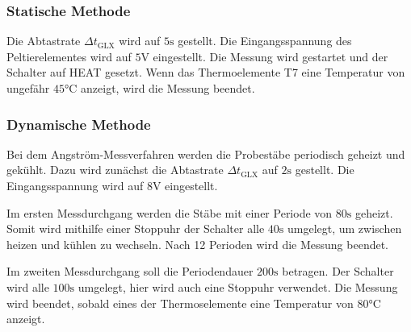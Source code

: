 \subsubsection{Statische Methode}
\label{subsubsec:statisch}
Die Abtastrate $\Delta t_\text{GLX}$ wird auf $5\si{\second}$ gestellt.
Die Eingangsspannung des Peltierelementes wird auf $5\si{\volt}$ eingestellt.
Die Messung wird gestartet und der Schalter auf HEAT gesetzt.
Wenn das Thermoelemente T7 eine Temperatur von ungefähr $45\si{\celsius}$ anzeigt,
wird die Messung beendet.
\subsubsection{Dynamische Methode}
\label{subsubsec:dynamisch}
Bei dem Angström-Messverfahren werden die Probestäbe periodisch geheizt und gekühlt.
Dazu wird zunächst die Abtastrate $\Delta t_\text{GLX}$ auf $2\si{\second}$ gestellt.
Die Eingangsspannung wird auf $8\si{\volt}$ eingestellt.

Im ersten Messdurchgang werden die Stäbe mit einer Periode von $80\si{\second}$ geheizt.
Somit wird mithilfe einer Stoppuhr der Schalter alle $40\si{\second}$ umgelegt, um zwischen heizen und kühlen zu wechseln.
Nach 12 Perioden wird die Messung beendet.

Im zweiten Messdurchgang soll die Periodendauer $200\si{\second}$ betragen.
Der Schalter wird alle $100\si{\second}$ umgelegt, hier wird auch eine Stoppuhr verwendet.
Die Messung wird beendet, sobald eines der Thermoselemente eine Temperatur von $80\si{\celsius}$ anzeigt.